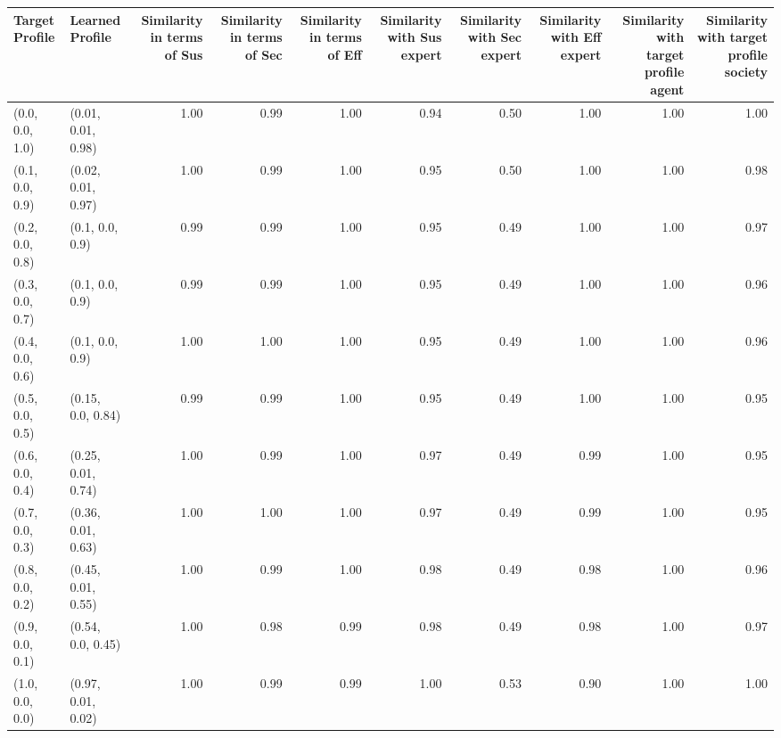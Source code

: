 \begin{tabular}{llrrrrrrrr}
\toprule
Target Profile & Learned Profile & Similarity in terms of Sus & Similarity in terms of Sec & Similarity in terms of Eff & Similarity with Sus expert & Similarity with Sec expert & Similarity with Eff expert & Similarity with target profile agent & Similarity with target profile society \\
\midrule
(0.0, 0.0, 1.0) & (0.01, 0.01, 0.98) & 1.00 & 0.99 & 1.00 & 0.94 & 0.50 & 1.00 & 1.00 & 1.00 \\
(0.1, 0.0, 0.9) & (0.02, 0.01, 0.97) & 1.00 & 0.99 & 1.00 & 0.95 & 0.50 & 1.00 & 1.00 & 0.98 \\
(0.2, 0.0, 0.8) & (0.1, 0.0, 0.9) & 0.99 & 0.99 & 1.00 & 0.95 & 0.49 & 1.00 & 1.00 & 0.97 \\
(0.3, 0.0, 0.7) & (0.1, 0.0, 0.9) & 0.99 & 0.99 & 1.00 & 0.95 & 0.49 & 1.00 & 1.00 & 0.96 \\
(0.4, 0.0, 0.6) & (0.1, 0.0, 0.9) & 1.00 & 1.00 & 1.00 & 0.95 & 0.49 & 1.00 & 1.00 & 0.96 \\
(0.5, 0.0, 0.5) & (0.15, 0.0, 0.84) & 0.99 & 0.99 & 1.00 & 0.95 & 0.49 & 1.00 & 1.00 & 0.95 \\
(0.6, 0.0, 0.4) & (0.25, 0.01, 0.74) & 1.00 & 0.99 & 1.00 & 0.97 & 0.49 & 0.99 & 1.00 & 0.95 \\
(0.7, 0.0, 0.3) & (0.36, 0.01, 0.63) & 1.00 & 1.00 & 1.00 & 0.97 & 0.49 & 0.99 & 1.00 & 0.95 \\
(0.8, 0.0, 0.2) & (0.45, 0.01, 0.55) & 1.00 & 0.99 & 1.00 & 0.98 & 0.49 & 0.98 & 1.00 & 0.96 \\
(0.9, 0.0, 0.1) & (0.54, 0.0, 0.45) & 1.00 & 0.98 & 0.99 & 0.98 & 0.49 & 0.98 & 1.00 & 0.97 \\
(1.0, 0.0, 0.0) & (0.97, 0.01, 0.02) & 1.00 & 0.99 & 0.99 & 1.00 & 0.53 & 0.90 & 1.00 & 1.00 \\
\bottomrule
\end{tabular}
